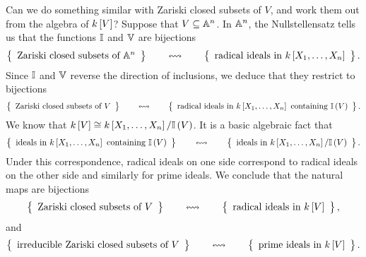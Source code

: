 Can we do something similar with Zariski closed subsets of $ V $, and work them out from the algebra of $ k\sbr{V} $? Suppose that $ V \subseteq \AA^n $. In $ \AA^n $, the Nullstellensatz tells us that the functions $ \II $ and $ \VV $ are bijections
$$ \correspondence{\text{Zariski closed subsets of} \ \AA^n}{\text{radical ideals in} \ k\sbr{X_1, \dots, X_n}}. $$
Since $ \II $ and $ \VV $ reverse the direction of inclusions, we deduce that they restrict to bijections
$$ \correspondence{\text{Zariski closed subsets of} \ V}{\text{radical ideals in} \ k\sbr{X_1, \dots, X_n} \ \text{containing} \ \II\br{V}}. $$
We know that $ k\sbr{V} \cong k\sbr{X_1, \dots, X_n} / \II\br{V} $. It is a basic algebraic fact that
$$ \correspondence{\text{ideals in} \ k\sbr{X_1, \dots, X_n} \ \text{containing} \ \II\br{V}}{\text{ideals in} \ k\sbr{X_1, \dots, X_n} / \II\br{V}}. $$
Under this correspondence, radical ideals on one side correspond to radical ideals on the other side and similarly for prime ideals. We conclude that the natural maps are bijections
$$ \correspondence{\text{Zariski closed subsets of} \ V}{\text{radical ideals in} \ k\sbr{V}}, $$
and
$$ \correspondence{\text{irreducible Zariski closed subsets of} \ V}{\text{prime ideals in} \ k\sbr{V}}. $$

